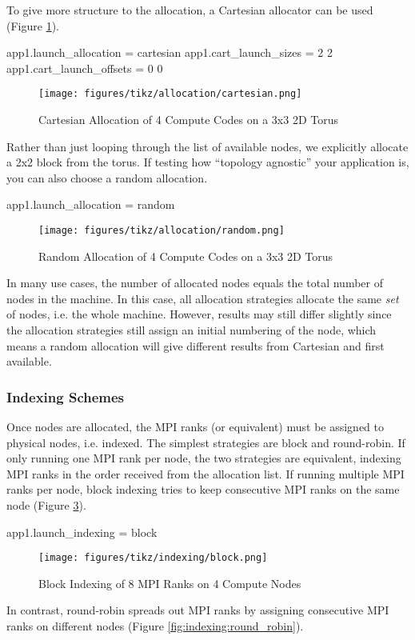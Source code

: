To give more structure to the allocation, a Cartesian allocator can be used (Figure \ref{fig:allocation:cartesian}).

\begin{ViFile}
app1.launch_allocation = cartesian
app1.cart_launch_sizes = 2 2
app1.cart_launch_offsets = 0 0
\end{ViFile}
\begin{figure}[h]
\centering
\texttt{[image: figures/tikz/allocation/cartesian.png]}
\caption{Cartesian Allocation of 4 Compute Codes on a 3x3 2D Torus}
\label{fig:allocation:cartesian}
\end{figure}
Rather than just looping through the list of available nodes, we explicitly allocate a 2x2 block from the torus.
If testing how ``topology agnostic'' your application is, you can also choose a random allocation.

\begin{ViFile}
app1.launch_allocation = random
\end{ViFile}
\begin{figure}[h]
\centering
\texttt{[image: figures/tikz/allocation/random.png]}
\caption{Random Allocation of 4 Compute Codes on a 3x3 2D Torus}
\label{fig:allocation:random}
\end{figure}

In many use cases, the number of allocated nodes equals the total number of nodes in the machine.
In this case, all allocation strategies allocate the same \emph{set} of nodes, i.e. the whole machine.
However, results may still differ slightly since the allocation strategies still assign an initial numbering of the node,
which means a random allocation will give different results from Cartesian and first available.


\subsubsection{Indexing Schemes}
\label{subsec:tutorial:indexing}
Once nodes are allocated, the MPI ranks (or equivalent) must be assigned to physical nodes, i.e. indexed.
The simplest strategies are block and round-robin.  If only running one MPI rank per node, the two strategies are equivalent,
indexing MPI ranks in the order received from the allocation list.
If running multiple MPI ranks per node, block indexing tries to keep consecutive MPI ranks on the same node (Figure \ref{fig:indexing:block}).

\begin{ViFile}
app1.launch_indexing = block
\end{ViFile}
\begin{figure}[h]
\centering
\texttt{[image: figures/tikz/indexing/block.png]}
\caption{Block Indexing of 8 MPI Ranks on 4 Compute Nodes}
\label{fig:indexing:block}
\end{figure}
In contrast, round-robin spreads out MPI ranks by assigning consecutive MPI ranks on different nodes (Figure \ref{fig:indexing:round_robin}).

